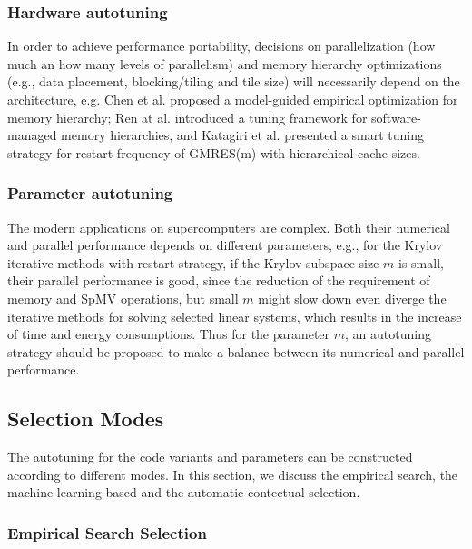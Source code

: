 	\subsubsection{Hardware autotuning}
	
	In order to achieve performance portability, decisions on parallelization (how much an how many levels of parallelism) and memory hierarchy optimizations (e.g., data placement, blocking/tiling and tile size) will necessarily depend on the architecture, e.g. Chen et al. \cite{chen2007model} proposed a model-guided empirical optimization for memory hierarchy;  Ren at al. \cite{ren2008tuning} introduced a tuning framework for software-managed memory hierarchies, and Katagiri et al. \cite{katagiri2012smart} presented a smart tuning strategy for restart frequency of GMRES(m) with hierarchical cache sizes.
	
	\subsubsection{Parameter autotuning}
	
	The modern applications on supercomputers are complex. Both their numerical and parallel performance depends on different parameters, e.g., for the Krylov iterative methods with restart strategy, if the Krylov subspace size $m$ is small, their parallel performance is good, since the reduction of the requirement of  memory and SpMV operations, but small $m$ might slow down even diverge the iterative methods for solving selected linear systems, which results in the increase of time and energy consumptions. Thus for the parameter $m$, an autotuning strategy should be proposed to make a balance between its numerical and parallel performance.

\subsection{Selection Modes}

The autotuning for the code variants and parameters can be constructed according to different modes. In this section, we discuss the empirical search, the machine learning based and the automatic contectual selection.
	
\subsubsection{Empirical Search Selection}

